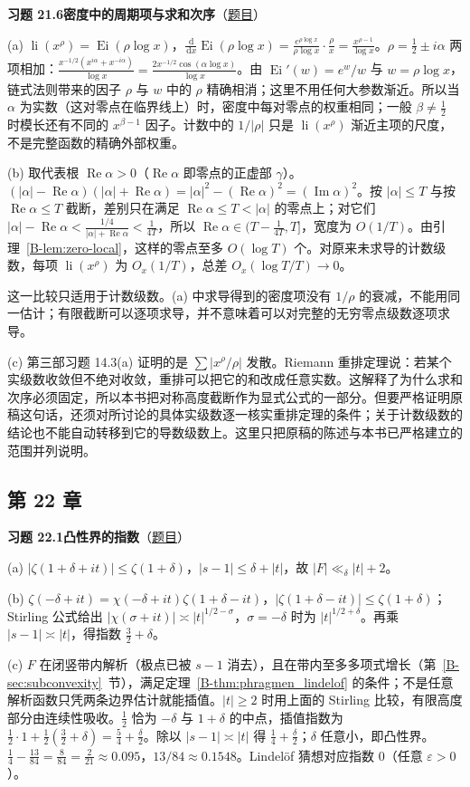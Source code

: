 \documentclass[11pt,a4paper]{article}
\DeclareMathOperator{\li}{li}
\DeclareMathOperator{\Ei}{Ei}
\newcommand{\dd}{\,\mathrm{d}}
\renewcommand{\Re}{\operatorname{Re}}
\renewcommand{\Im}{\operatorname{Im}}
\newcommand{\bref}[1]{\ref*{B-#1}}
\newcommand{\Sol}[2]{%
  \par\addvspace{1.2em}\noindent
  \hypertarget{s:#1}{}\textbf{习题 #1\quad #2}\hfill{\small（\hyperlink{q:#1}{题目}）}\par
  \nopagebreak\smallskip}
\begin{document}
\Sol{21.6}{密度中的周期项与求和次序}
(a) $\li(x^\rho)=\Ei(\rho\log x)$，$\frac{\dd}{\dd x}\Ei(\rho\log x)=\frac{e^{\rho\log x}}{\rho\log x}\cdot\frac\rho x=\frac{x^{\rho-1}}{\log x}$。$\rho=\frac12\pm i\alpha$ 两项相加：$\frac{x^{-1/2}(x^{i\alpha}+x^{-i\alpha})}{\log x}=\frac{2x^{-1/2}\cos(\alpha\log x)}{\log x}$。由 $\Ei'(w)=e^w/w$ 与 $w=\rho\log x$，链式法则带来的因子 $\rho$ 与 $w$ 中的 $\rho$ 精确相消；这里不用任何大参数渐近。所以当 $\alpha$ 为实数（这对零点在临界线上）时，密度中每对零点的权重相同；一般 $\beta\ne\frac12$ 时模长还有不同的 $x^{\beta-1}$ 因子。计数中的 $1/|\rho|$ 只是 $\li(x^\rho)$ 渐近主项的尺度，不是完整函数的精确外部权重。

(b) 取代表根 $\Re\alpha>0$（$\Re\alpha$ 即零点的正虚部 $\gamma$）。$(|\alpha|-\Re\alpha)(|\alpha|+\Re\alpha)=|\alpha|^2-(\Re\alpha)^2=(\Im\alpha)^2$。按 $|\alpha|\le T$ 与按 $\Re\alpha\le T$ 截断，差别只在满足 $\Re\alpha\le T<|\alpha|$ 的零点上；对它们 $|\alpha|-\Re\alpha<\frac{1/4}{|\alpha|+\Re\alpha}<\frac1{4T}$，所以 $\Re\alpha\in(T-\frac1{4T},T]$，宽度为 $O(1/T)$。由引理~\bref{lem:zero-local}，这样的零点至多 $O(\log T)$ 个。对原来未求导的计数级数，每项 $\li(x^\rho)$ 为 $O_x(1/T)$，总差 $O_x(\log T/T)\to0$。

这一比较只适用于计数级数。(a) 中求导得到的密度项没有 $1/\rho$ 的衰减，不能用同一估计；有限截断可以逐项求导，并不意味着可以对完整的无穷零点级数逐项求导。

(c) 第三部习题 14.3(a) 证明的是 $\sum|x^\rho/\rho|$ 发散。Riemann 重排定理说：若某个实级数收敛但不绝对收敛，重排可以把它的和改成任意实数。这解释了为什么求和次序必须固定，所以本书把对称高度截断作为显式公式的一部分。但要严格证明原稿这句话，还须对所讨论的具体实级数逐一核实重排定理的条件；关于计数级数的结论也不能自动转移到它的导数级数上。这里只把原稿的陈述与本书已严格建立的范围并列说明。

\subsection*{第 22 章}

\Sol{22.1}{凸性界的指数}
(a) $|\zeta(1+\delta+it)|\le\zeta(1+\delta)$，$|s-1|\le\delta+|t|$，故 $|F|\ll_\delta|t|+2$。

(b) $\zeta(-\delta+it)=\chi(-\delta+it)\zeta(1+\delta-it)$，$|\zeta(1+\delta-it)|\le\zeta(1+\delta)$；Stirling 公式给出 $|\chi(\sigma+it)|\asymp|t|^{1/2-\sigma}$，$\sigma=-\delta$ 时为 $|t|^{1/2+\delta}$。再乘 $|s-1|\asymp|t|$，得指数 $\frac32+\delta$。

(c) $F$ 在闭竖带内解析（极点已被 $s-1$ 消去），且在带内至多多项式增长（第~\bref{sec:subconvexity}~节），满足定理~\bref{thm:phragmen_lindelof} 的条件；不是任意解析函数只凭两条边界估计就能插值。$|t|\ge2$ 时用上面的 Stirling 比较，有限高度部分由连续性吸收。$\frac12$ 恰为 $-\delta$ 与 $1+\delta$ 的中点，插值指数为 $\frac12\cdot1+\frac12(\frac32+\delta)=\frac54+\frac\delta2$。除以 $|s-1|\asymp|t|$ 得 $\frac14+\frac\delta2$；$\delta$ 任意小，即凸性界。$\frac14-\frac{13}{84}=\frac{8}{84}=\frac2{21}\approx0.095$，$13/84\approx0.1548$。Lindelöf 猜想对应指数 $0$（任意 $\varepsilon>0$）。
\end{document}

